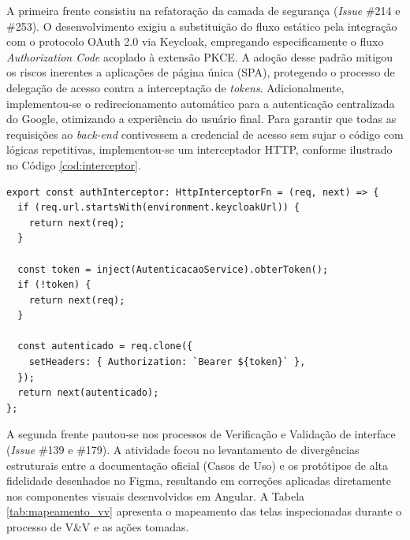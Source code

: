 A primeira frente consistiu na refatoração da camada de segurança (\textit{Issue} \#214 e \#253). O desenvolvimento exigiu a substituição do fluxo estático pela integração com o protocolo OAuth 2.0 via Keycloak, empregando especificamente o fluxo \textit{Authorization Code} acoplado à extensão PKCE. A adoção desse padrão mitigou os riscos inerentes a aplicações de página única (SPA), protegendo o processo de delegação de acesso contra a interceptação de \textit{tokens}. Adicionalmente, implementou-se o redirecionamento automático para a autenticação centralizada do Google, otimizando a experiência do usuário final. Para garantir que todas as requisições ao \textit{back-end} contivessem a credencial de acesso sem sujar o código com lógicas repetitivas, implementou-se um interceptador HTTP, conforme ilustrado no Código \ref{cod:interceptor}.

\begin{center}
\begin{minipage}{0.95\textwidth}
\begin{codigo}[H]
\footnotesize
\begin{verbatim}
export const authInterceptor: HttpInterceptorFn = (req, next) => {
  if (req.url.startsWith(environment.keycloakUrl)) {
    return next(req);
  }

  const token = inject(AutenticacaoService).obterToken();
  if (!token) {
    return next(req);
  }

  const autenticado = req.clone({
    setHeaders: { Authorization: `Bearer ${token}` },
  });
  return next(autenticado);
};
\end{verbatim}
\caption{Interceptador HTTP em Angular para injeção automática do \textit{Token} JWT.}
\label{cod:interceptor}
\end{codigo}
\end{minipage}
\end{center}

A segunda frente pautou-se nos processos de Verificação e Validação de interface (\textit{Issue} \#139 e \#179). A atividade focou no levantamento de divergências estruturais entre a documentação oficial (Casos de Uso) e os protótipos de alta fidelidade desenhados no Figma, resultando em correções aplicadas diretamente nos componentes visuais desenvolvidos em Angular. A Tabela \ref{tab:mapeamento_vv} apresenta o mapeamento das telas inspecionadas durante o processo de V\&V e as ações tomadas.

